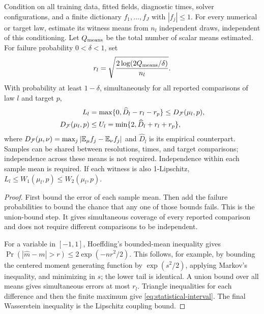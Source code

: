 \begin{proposition}
\label{prop:statistical-proof}
Condition on all training data, fitted fields, diagnostic times,
solver configurations, and a finite dictionary $f_1,\ldots,f_J$ with
$|f_j|\le1$. For every numerical or target law, estimate its witness means
from $n_l$ independent draws, independent of this conditioning. Let $Q_{\rm
means}$ be the total number of scalar means estimated. For failure
probability $0<\delta<1$, set
\[
 r_l=\sqrt{\frac{2\log(2Q_{\rm means}/\delta)}{n_l}}.
\]
With probability at least $1-\delta$, simultaneously for all reported
comparisons of law $l$ and target $p$,
\begin{align}
 L_l&=\max\{0,\widehat D_l-r_l-r_p\}\le D_{\cal F}(\mu_l,p),\\
 D_{\cal F}(\mu_l,p)&\le U_l=\min\{2,\widehat D_l+r_l+r_p\},
 \label{eq:statistical-interval}
\end{align}
where $D_{\cal F}(\mu,\nu)=\max_j|\mathbb E_\mu f_j-\mathbb E_\nu f_j|$ and
$\widehat D_l$ is its empirical counterpart. Samples can be shared between
resolutions, times, and target comparisons; independence across these
means is not required. Independence within each sample mean is required.
If each witness is also 1-Lipschitz, $L_l\le W_1(\mu_l,p)\le W_2(\mu_l,p)$.
\end{proposition}
\begin{proof}
First bound the error of each sample mean. Then add the failure
probabilities to bound the chance that any one of those bounds fails.
This is the union-bound step. It gives simultaneous coverage of every
reported comparison and does not require different comparisons to be independent.

For a variable in $[-1,1]$, Hoeffding's bounded-mean inequality gives
$\Pr(|\widehat m-m|>r)\le2\exp(-nr^2/2)$.
This follows, for example, by bounding the centered moment generating
function by $\exp(s^2/2)$, applying Markov's inequality, and minimizing in
$s$; the lower tail is identical. A union bound over all means gives
simultaneous errors at most $r_l$. Triangle inequalities for each difference
and then the finite maximum give \eqref{eq:statistical-interval}.
The final Wasserstein inequality is the Lipschitz coupling bound.
\end{proof}

